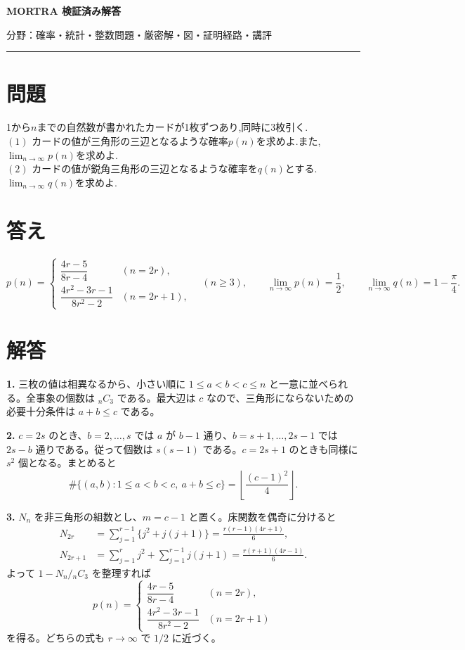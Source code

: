 \documentclass[uplatex,dvipdfmx,11pt]{jsarticle}
\begin{document}
\begin{center}
{\LARGE\bfseries MORTRA 検証済み解答\par}
\vspace{1mm}
{\small 分野：確率・統計・整数\qquad 問題・厳密解・図・証明経路・講評}
\end{center}
\vspace{1mm}
\hrule
\vspace{5mm}

\section*{問題}
1から$n$までの自然数が書かれたカードが1枚ずつあり,同時に3枚引く.\\
$(1)$ カードの値が三角形の三辺となるような確率$p(n)$を求めよ.また,$\displaystyle \lim_{n\to\infty}p(n)$を求めよ.\\
$(2)$ カードの値が鋭角三角形の三辺となるような確率を$q(n)$とする.$\displaystyle \lim_{n\to\infty}q(n)$を求めよ.

\section*{答え}
\[
p(n)=
\begin{cases}
\dfrac{4r-5}{8r-4}&(n=2r),\\[4pt]
\dfrac{4r^2-3r-1}{8r^2-2}&(n=2r+1),
\end{cases}
\quad(n\ge3),
\qquad
\lim_{n\to\infty}p(n)=\frac12,
\qquad
\lim_{n\to\infty}q(n)=1-\frac\pi4.
\]

\section*{解答}
\textbf{1.} 三枚の値は相異なるから、小さい順に \(1\le a<b<c\le n\) と一意に並べられる。全事象の個数は \({}_{n}C_3\) である。最大辺は \(c\) なので、三角形にならないための必要十分条件は \(a+b\le c\) である。

\textbf{2.} \(c=2s\) のとき、\(b=2,\ldots,s\) では \(a\) が \(b-1\) 通り、\(b=s+1,\ldots,2s-1\) では \(2s-b\) 通りである。従って個数は \(s(s-1)\) である。\(c=2s+1\) のときも同様に \(s^2\) 個となる。まとめると \[\#\{(a,b):1\le a<b<c,\ a+b\le c\}=\left\lfloor\frac{(c-1)^2}{4}\right\rfloor.\]

\textbf{3.} \(N_{n}\) を非三角形の組数とし、\(m=c-1\) と置く。床関数を偶奇に分けると \[\begin{aligned}N_{2r}&=\sum_{j=1}^{r-1}\{j^2+j(j+1)\}=\frac{r(r-1)(4r+1)}6,\\N_{2r+1}&=\sum_{j=1}^rj^2+\sum_{j=1}^{r-1}j(j+1)=\frac{r(r+1)(4r-1)}6.\end{aligned}\] よって \(1-N_{n}/{}_{n}C_3\) を整理すれば \[p(n)=\begin{cases}\dfrac{4r-5}{8r-4}&(n=2r),\\[3pt]\dfrac{4r^2-3r-1}{8r^2-2}&(n=2r+1)\end{cases}\] を得る。どちらの式も \(r\to\infty\) で \(1/2\) に近づく。
\end{document}
